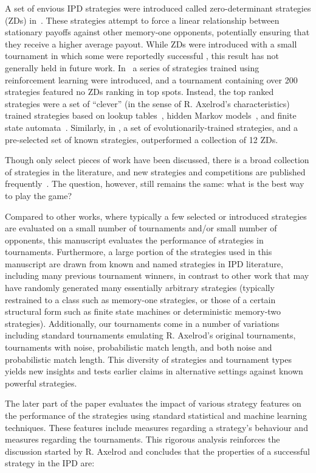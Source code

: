 \documentclass{article}
\newcommand{\numberofalltournaments}{}
\newcommand{\numberofstrategies}{}
\begin{document}
A set of envious IPD strategies were introduced called zero-determinant strategies (ZDs)
in~\cite{Press2012}. These strategies attempt to force a linear relationship between
stationary payoffs against other memory-one opponents, potentially ensuring that they
receive a higher average payout. While ZDs were introduced with a small tournament in
which some were reportedly successful \cite{Stewart2012}, this result has not generally
held in future work. In~\cite{Harper2017} a series of strategies trained using
reinforcement learning were introduced, and a tournament containing over 200 strategies
featured no ZDs ranking in top spots. Instead, the top ranked strategies
were a set of ``clever'' (in the sense of R. Axelrod's characteristics) trained
strategies based on lookup tables~\cite{Axelrod1987}, hidden Markov
models~\cite{Harper2017}, and finite state automata~\cite{Miller1996}.
Similarly, in \cite{mathieu2017}, a set of evolutionarily-trained strategies,
and a pre-selected set of known strategies, outperformed a collection of 12 ZDs.

Though only select pieces of work have been discussed, there is a broad collection
of strategies in the literature, and new strategies and competitions are
published frequently~\cite{Glynatsi2019}. The question, however, still remains
the same: what is the best way to play the game?

Compared to other works, where typically a few selected or introduced strategies
are evaluated on a small number of tournaments and/or small number of opponents,
this manuscript evaluates the performance of \numberofstrategies
strategies in \numberofalltournaments tournaments. Furthermore, a large portion
of the strategies used in this manuscript are drawn from known and named strategies
in IPD literature, including many previous tournament winners,
in contrast to other work that may have randomly generated many essentially arbitrary
strategies (typically restrained to a class such as memory-one strategies,
or those of a certain structural form such as finite state machines or deterministic
memory-two strategies). Additionally, our tournaments come in a
number of variations including standard tournaments emulating R. Axelrod's original tournaments,
tournaments with noise, probabilistic match length, and both noise and probabilistic match length.
This diversity of strategies and tournament types yields new insights and tests
earlier claims in alternative settings against known powerful strategies.

The later part of the paper evaluates the impact of various strategy features
on the performance of the strategies using standard statistical and machine learning techniques. These
features include measures regarding a strategy's behaviour and measures regarding
the tournaments. This rigorous analysis reinforces the discussion started by R. Axelrod
and concludes that the properties of a successful strategy in the IPD are:
\end{document}
